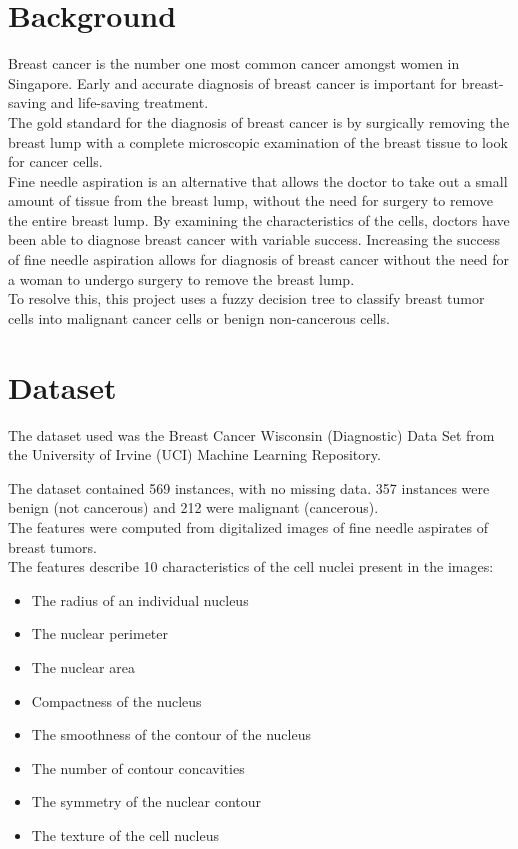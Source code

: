 
\section{Background}
Breast cancer is the number one most common cancer amongst women in Singapore. Early and accurate diagnosis of breast cancer is important for breast-saving and life-saving treatment. \\

The gold standard for the diagnosis of breast cancer is by surgically removing the breast lump with a complete microscopic examination of the breast tissue to look for cancer cells. \\

Fine needle aspiration is an alternative that allows the doctor to take out a small amount of tissue from the breast lump, without the need for surgery to remove the entire breast lump. By examining the characteristics of the cells, doctors have been able to diagnose breast cancer with variable success. Increasing the success of fine needle aspiration allows for diagnosis of breast cancer without the need for a woman to undergo surgery to remove the breast lump. \\

To resolve this, this project uses a fuzzy decision tree to classify breast tumor cells into malignant cancer cells or benign non-cancerous cells. \\

\section{Dataset}
The dataset used was the Breast Cancer Wisconsin (Diagnostic) Data Set from the University of Irvine (UCI) Machine Learning Repository.  

The dataset contained 569 instances, with no missing data. 357 instances were benign (not cancerous) and 212 were malignant (cancerous). \\

The features were computed from digitalized images of fine needle aspirates of breast tumors.  \\

The features describe 10 characteristics of the cell nuclei present in the images:

\begin{itemize}
	\item The radius of an individual nucleus
	\item The nuclear perimeter
	\item The nuclear area
	\item Compactness of the nucleus
	\item The smoothness of the contour of the nucleus
	\item The number of contour concavities
	\item The symmetry of the nuclear contour
	\item The texture of the cell nucleus
\end{itemize}

